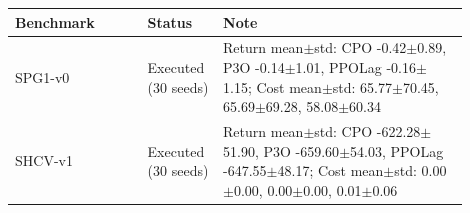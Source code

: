 \footnotesize
\setlength{\tabcolsep}{3pt}
\begin{tabular}{p{0.27\linewidth}p{0.13\linewidth}p{0.50\linewidth}}
\toprule
Benchmark & Status & Note \\
\midrule
SPG1-v0 & Executed (30 seeds) & Return mean$\pm$std: CPO -0.42$\pm$0.89, P3O -0.14$\pm$1.01, PPOLag -0.16$\pm$1.15; Cost mean$\pm$std: 65.77$\pm$70.45, 65.69$\pm$69.28, 58.08$\pm$60.34 \\
SHCV-v1 & Executed (30 seeds) & Return mean$\pm$std: CPO -622.28$\pm$51.90, P3O -659.60$\pm$54.03, PPOLag -647.55$\pm$48.17; Cost mean$\pm$std: 0.00$\pm$0.00, 0.00$\pm$0.00, 0.01$\pm$0.06 \\
\bottomrule
\end{tabular}
